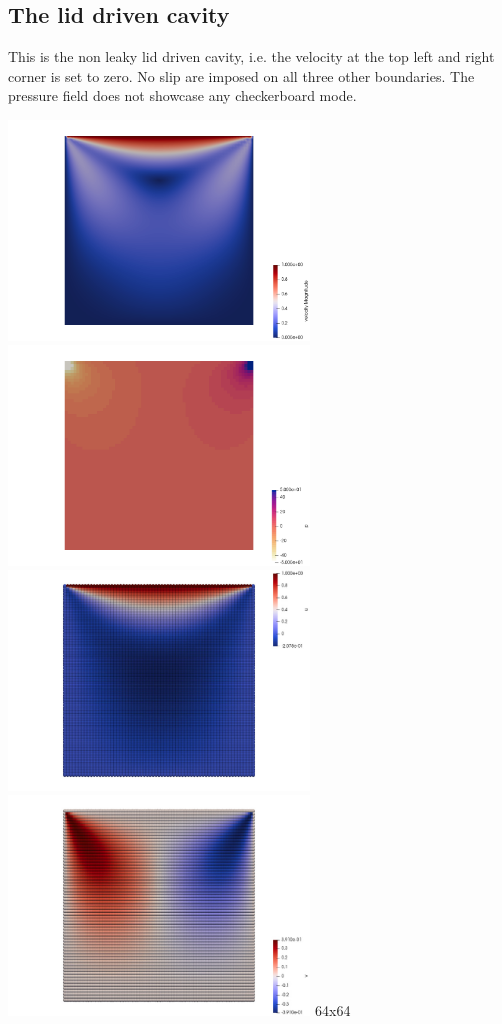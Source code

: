 \subsection*{The lid driven cavity}

This is the non leaky lid driven cavity, i.e. the velocity at the top left and right corner 
is set to zero. No slip are imposed on all three other boundaries. 
The pressure field does not showcase any checkerboard mode. 

\begin{center}
\includegraphics[width=8cm]{python_codes/fieldstone_80/results/ldc/vel}
\includegraphics[width=8cm]{python_codes/fieldstone_80/results/ldc/p}\\
\includegraphics[width=8cm]{python_codes/fieldstone_80/results/ldc/u_dofs}
\includegraphics[width=8cm]{python_codes/fieldstone_80/results/ldc/v_dofs}
{\captionfont 64x64}
\end{center}

